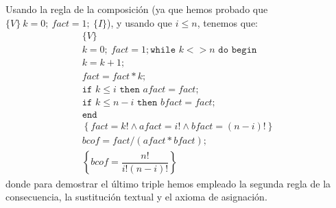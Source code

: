 \begin{ejercicio}
    Usando la regla de la composición (ya que hemos probado que $\{V\}\ k=0;\ fact=1;\ \{I\}$), y usando que $i\leq n$, tenemos que:
    \begin{gather*}
        \{V\}\ \\
        k=0;\ fact=1;
        \texttt{while\ } k <> n \texttt{\ do\ begin} \\
        k = k + 1; \\
        fact = fact * k; \\
        \texttt{if\ } k \leq i \texttt{\ then\ } afact = fact; \\
        \texttt{if\ } k \leq n-i \texttt{\ then\ } bfact = fact; \\
        \texttt{end} \\
        \left\{fact = k! \land afact = i! \land bfact = (n-i)!\right\} \\
        bcof = fact/(afact*bfact); \\
        \left\{bcof = \dfrac{n!}{i!(n-i)!}\right\}
    \end{gather*}
    donde para demostrar el último triple hemos empleado la segunda regla de la consecuencia, la sustitución textual y el axioma de asignación.


\end{ejercicio}
